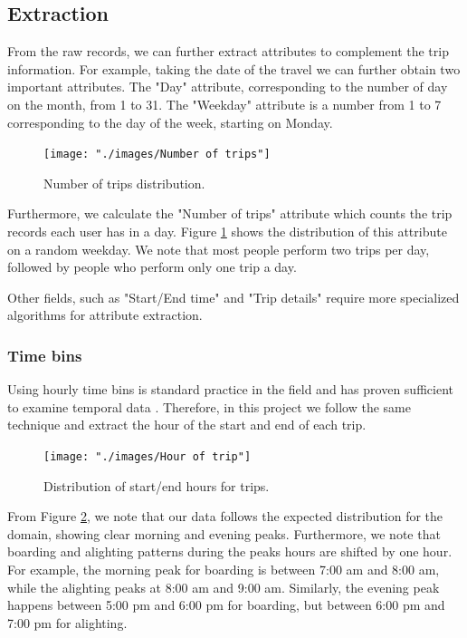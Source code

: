 \documentclass{article}
\begin{document}
\subsection{Extraction}
From the raw records, we can further extract attributes to complement the trip information. For example, taking the date of the travel we can further obtain two important attributes. The "Day" attribute, corresponding to the number of day on the month, from 1 to 31. The "Weekday" attribute is a number from 1 to 7 corresponding to the day of the week, starting on Monday.

\begin{figure}[H]
  \centering
  \texttt{[image: "./images/Number of trips"]}
  \caption{Number of trips distribution.}
  \label{fig:preprocessing/num_trips}
\end{figure}

Furthermore, we calculate the "Number of trips" attribute which counts the trip records each user has in a day. Figure \ref{fig:preprocessing/num_trips} shows the distribution of this attribute on a random weekday. We note that most people perform two trips per day, followed by people who perform only one trip a day. 

Other fields, such as "Start/End time" and "Trip details" require more specialized algorithms for attribute extraction.

\subsubsection{Time bins}
Using hourly time bins is standard practice in the field and has proven sufficient to examine temporal data \cite{langlois2016inferring} \cite{ma2017understanding} \cite{morency2007measuring}. Therefore, in this project we follow the same technique and extract the hour of the start and end of each trip.

\begin{figure}[H]
  \centering
  \texttt{[image: "./images/Hour of trip"]}
  \caption{Distribution of start/end hours for trips.}
  \label{fig:preprocessing/start_end_hour}
\end{figure}

From Figure \ref{fig:preprocessing/start_end_hour}, we note that our data follows the expected distribution for the domain, showing clear morning and evening peaks. Furthermore, we note that boarding and alighting patterns during the peaks hours are shifted by one hour. For example, the morning peak for boarding is between 7:00 am and 8:00 am, while the alighting peaks at 8:00 am and 9:00 am. Similarly, the evening peak happens between 5:00 pm and 6:00 pm for boarding, but between 6:00 pm and 7:00 pm for alighting. 
\end{document}
